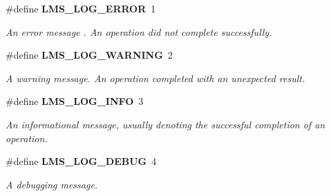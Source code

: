 \begin{DoxyCompactItemize}
\#define {\bf L\+M\+S\+\_\+\+L\+O\+G\+\_\+\+E\+R\+R\+OR}~1
\begin{DoxyCompactList}\small\item\em An error message . An operation did not complete successfully. \end{DoxyCompactList}\item 
\#define {\bf L\+M\+S\+\_\+\+L\+O\+G\+\_\+\+W\+A\+R\+N\+I\+NG}~2
\begin{DoxyCompactList}\small\item\em A warning message. An operation completed with an unexpected result. \end{DoxyCompactList}\item 
\#define {\bf L\+M\+S\+\_\+\+L\+O\+G\+\_\+\+I\+N\+FO}~3
\begin{DoxyCompactList}\small\item\em An informational message, usually denoting the successful completion of an operation. \end{DoxyCompactList}\item 
\#define {\bf L\+M\+S\+\_\+\+L\+O\+G\+\_\+\+D\+E\+B\+UG}~4
\begin{DoxyCompactList}\small\item\em A debugging message. \end{DoxyCompactList}\end{DoxyCompactItemize}
